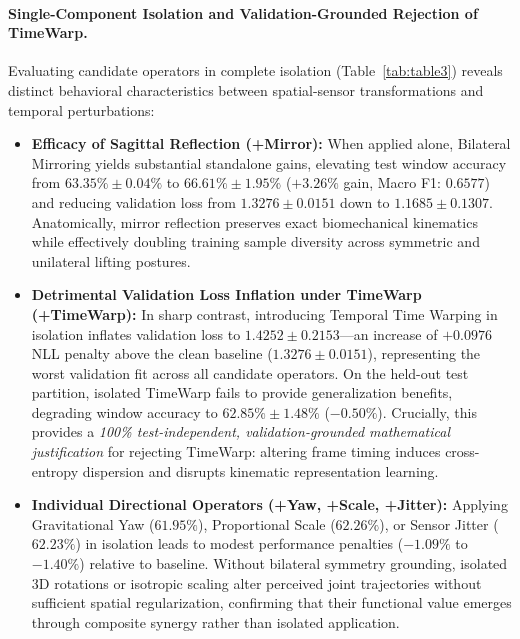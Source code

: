 \documentclass[runningheads]{llncs}
\begin{document}
\paragraph{Single-Component Isolation and Validation-Grounded Rejection of TimeWarp.}
Evaluating candidate operators in complete isolation (Table~\ref{tab:table3}) reveals distinct behavioral characteristics between spatial-sensor transformations and temporal perturbations:
\begin{itemize}
    \item \textbf{Efficacy of Sagittal Reflection (+Mirror):} When applied alone, Bilateral Mirroring yields substantial standalone gains, elevating test window accuracy from $63.35\% \pm 0.04\%$ to $66.61\% \pm 1.95\%$ ($+3.26\%$ gain, Macro F1: $0.6577$) and reducing validation loss from $1.3276 \pm 0.0151$ down to $1.1685 \pm 0.1307$. Anatomically, mirror reflection preserves exact biomechanical kinematics while effectively doubling training sample diversity across symmetric and unilateral lifting postures.
    \item \textbf{Detrimental Validation Loss Inflation under TimeWarp (+TimeWarp):} In sharp contrast, introducing Temporal Time Warping in isolation inflates validation loss to \textbf{$1.4252 \pm 0.2153$}---an increase of $+0.0976$ NLL penalty above the clean baseline ($1.3276 \pm 0.0151$), representing the worst validation fit across all candidate operators. On the held-out test partition, isolated TimeWarp fails to provide generalization benefits, degrading window accuracy to $62.85\% \pm 1.48\%$ ($-0.50\%$). Crucially, this provides a \textit{100\% test-independent, validation-grounded mathematical justification} for rejecting TimeWarp: altering frame timing induces cross-entropy dispersion and disrupts kinematic representation learning.
    \item \textbf{Individual Directional Operators (+Yaw, +Scale, +Jitter):} Applying Gravitational Yaw ($61.95\%$), Proportional Scale ($62.26\%$), or Sensor Jitter ($62.23\%$) in isolation leads to modest performance penalties ($-1.09\%$ to $-1.40\%$) relative to baseline. Without bilateral symmetry grounding, isolated 3D rotations or isotropic scaling alter perceived joint trajectories without sufficient spatial regularization, confirming that their functional value emerges through composite synergy rather than isolated application.
\end{itemize}
\end{document}
